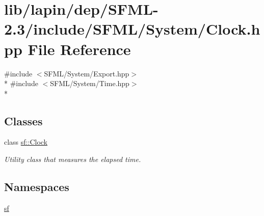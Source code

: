 \hypertarget{lapin_2dep_2_s_f_m_l-2_83_2include_2_s_f_m_l_2_system_2_clock_8hpp}{\section{lib/lapin/dep/\-S\-F\-M\-L-\/2.3/include/\-S\-F\-M\-L/\-System/\-Clock.hpp File Reference}
\label{lapin_2dep_2_s_f_m_l-2_83_2include_2_s_f_m_l_2_system_2_clock_8hpp}
}
{\ttfamily \#include $<$S\-F\-M\-L/\-System/\-Export.\-hpp$>$}\\*
{\ttfamily \#include $<$S\-F\-M\-L/\-System/\-Time.\-hpp$>$}\\*
\subsection*{Classes}
\begin{DoxyCompactItemize}
\item 
class \hyperlink{classsf_1_1_clock}{sf\-::\-Clock}
\begin{DoxyCompactList}\small\item\em Utility class that measures the elapsed time. \end{DoxyCompactList}\end{DoxyCompactItemize}
\subsection*{Namespaces}
\begin{DoxyCompactItemize}
\item 
\hyperlink{namespacesf}{sf}
\end{DoxyCompactItemize}
